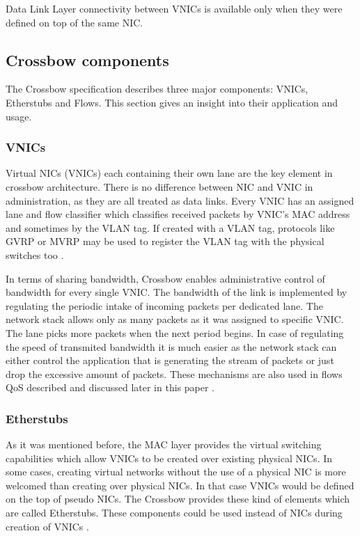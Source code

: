 \documentclass[11pt]{book}
\begin{document}
        Data Link Layer connectivity between VNICs is available only when they were defined on top of the same NIC. 

	
      \subsection{Crossbow components}

        The Crossbow specification describes three major components: VNICs, Etherstubs and Flows. This section gives an
        insight into their application and usage.

                
        \subsubsection{VNICs}
        
          Virtual NICs (VNICs) each containing their own lane are the key element in crossbow architecture. There is no
          difference between NIC and VNIC in administration, as they are all treated as data links. Every VNIC has an
          assigned lane and flow classifier which classifies received packets by VNIC's MAC address and sometimes by the
          VLAN tag.  If created with a VLAN tag, protocols like GVRP or MVRP may be used to register the VLAN tag with
          the physical switches too \cite{crossbow}.	

          In terms of sharing bandwidth, Crossbow enables administrative control of bandwidth for every single VNIC. The
          bandwidth of the link is implemented by regulating the periodic intake of incoming packets per dedicated lane.
          The network stack allows only as many packets as it was assigned to specific VNIC. The lane picks more packets
          when the next period begins. In case of regulating the speed of transmited bandwidth it is much easier as the
          network stack can either control the application that is generating the stream of packets or just drop the
          excessive amount of packets.  These mechanisms are also used in flows QoS described and discussed later in
          this paper \cite{crossbow}.


        \subsubsection{Etherstubs}

          As it was mentioned before, the MAC layer provides the virtual switching capabilities which allow VNICs to be
          created over existing physical NICs.  In some cases, creating virtual networks without the use of a physical
          NIC is more welcomed than creating over physical NICs. In that case VNICs would be defined on the top of
          pseudo NICs.  The Crossbow provides these kind of elements which are called Etherstubs. These components could
          be used instead of NICs during creation of VNICs \cite{crossbow}.
\end{document}
